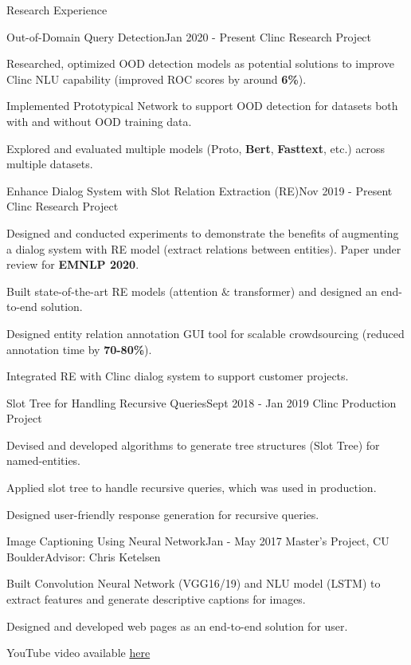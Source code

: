 \documentclass{resume} %
\begin{document}
\begin{rSection}{Research Experience}

\begin{rSubsection}{Out-of-Domain Query Detection}{Jan 2020 - Present }{Clinc Research Project}{}
\item Researched, optimized OOD detection models as potential solutions to improve Clinc NLU capability (improved ROC scores by around \textbf{6\%}).
\item Implemented Prototypical Network to support OOD detection for datasets both with and without OOD training data.
\item Explored and evaluated multiple models (Proto, \textbf{Bert}, \textbf{Fasttext}, etc.) across multiple datasets.
\end{rSubsection}

\begin{rSubsection}{Enhance Dialog System with Slot Relation Extraction (RE)}{Nov 2019 - Present }{Clinc Research Project}{}
\item Designed and conducted experiments to demonstrate the benefits of augmenting a dialog system with RE model (extract relations between entities). Paper under review for \textbf{EMNLP 2020}.
\item Built state-of-the-art RE models (attention $\&$ transformer) and designed an end-to-end solution.
\item Designed entity relation annotation GUI tool for scalable crowdsourcing (reduced annotation time by \textbf{70-80\%}).
\item Integrated RE with Clinc dialog system to support customer projects.
\end{rSubsection}

\begin{rSubsection}{Slot Tree for Handling Recursive Queries}{Sept 2018 - Jan 2019 }{Clinc Production Project}{}
\item Devised and developed algorithms to generate tree structures (Slot Tree) for named-entities.
\item Applied slot tree to handle recursive queries, which was used in production. 
\item Designed user-friendly response generation for recursive queries.
\end{rSubsection}

\begin{rSubsection}{Image Captioning Using Neural Network}{Jan - May 2017 }{Master's Project, CU Boulder}{Advisor: Chris Ketelsen}
\item Built Convolution Neural Network (VGG16/19) and NLU model (LSTM) to extract features and generate descriptive captions for images.
\item Designed and developed web pages as an end-to-end solution for user.
\item YouTube video available \href{https://www.youtube.com/watch?v=f2waevH1b6I}{here}
\end{rSubsection}


\end{rSection}
\end{document}
